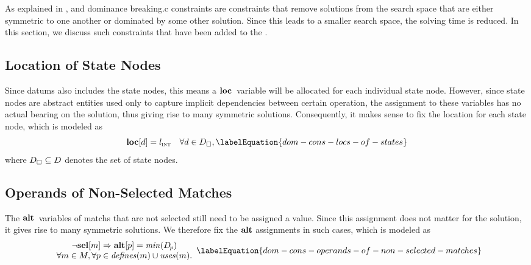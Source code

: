 As explained in ,  and \gls{dominance breaking.c} \glspl{constraint} are
\glspl{constraint} that remove \glspl{solution} from the \gls{search space} that
are either symmetric to one another or dominated by some other \gls{solution}.
%
Since this leads to a smaller \gls{search space}, the solving time is reduced.
%
In this section, we discuss such \glspl{constraint} that have been added to the
.


\subsection{Location of State Nodes}

Since \glspl{datum} also includes the \glspl{state node}, this means a
$\mVar{loc}$~\gls{variable} will be allocated for each individual \gls{state
  node}.
%
However, since \glspl{state node} are abstract entities used only to capture
implicit dependencies between certain \gls{operation}, the assignment to these
\glspl{variable} has no actual bearing on the \gls{solution}, thus giving rise
to many symmetric \glspl{solution}.
%
Consequently, it makes sense to fix the \gls{location} for each \gls{state
  node}, which is modeled as
%
\begin{equation}
  \mVar{loc}[d] = \mIntLocation
  \mQuantSep
  \forall d \in \mStateDataSet,
  \labelEquation{dom-cons-locs-of-states}
\end{equation}
%
where \mbox{$\mStateDataSet \subseteq \mDataSet$} denotes the set of
\glspl{state node}.


\subsection{Operands of Non-Selected Matches}

The $\mVar{alt}$~\glspl{variable} of \glspl{match} that are not selected still
need to be assigned a value.
%
Since this assignment does not matter for the \gls{solution}, it gives rise to
many symmetric \glspl{solution}.
%
We therefore fix the $\mVar{alt}$ assignments in such cases, which is modeled as
%
\begin{equation}
  \begin{array}{c}
    \neg\mVar{sel}[m] \mImp \mVar{alt}[p] = \mMin(\mDataSet[\hspace{-1pt}p]) \\
    \forall m \in \mMatchSet,
    \forall p \in \mDefines(m) \cup \mUses(m).
  \end{array}
  \labelEquation{dom-cons-operands-of-non-selected-matches}
\end{equation}

